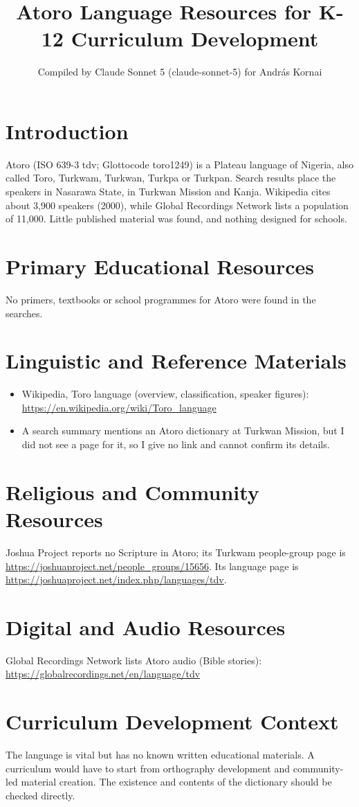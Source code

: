 \documentclass[12pt]{article}
\title{Atoro Language Resources for K-12 Curriculum Development}
\author{Compiled by Claude Sonnet 5 (claude-sonnet-5) for Andr\'as Kornai}
\date{}
\begin{document}
\maketitle

\section{Introduction}
Atoro (ISO 639-3 tdv; Glottocode toro1249) is a Plateau language of Nigeria, also called Toro, Turkwam, Turkwan, Turkpa or Turkpan. Search results place the speakers in Nasarawa State, in Turkwan Mission and Kanja. Wikipedia cites about 3,900 speakers (2000), while Global Recordings Network lists a population of 11,000. Little published material was found, and nothing designed for schools.

\section{Primary Educational Resources}
No primers, textbooks or school programmes for Atoro were found in the searches.

\section{Linguistic and Reference Materials}
\begin{itemize}
\item Wikipedia, Toro language (overview, classification, speaker figures): \url{https://en.wikipedia.org/wiki/Toro_language}
\item A search summary mentions an Atoro dictionary at Turkwan Mission, but I did not see a page for it, so I give no link and cannot confirm its details.
\end{itemize}

\section{Religious and Community Resources}
Joshua Project reports no Scripture in Atoro; its Turkwam people-group page is \url{https://joshuaproject.net/people_groups/15656}. Its language page is \url{https://joshuaproject.net/index.php/languages/tdv}.

\section{Digital and Audio Resources}
Global Recordings Network lists Atoro audio (Bible stories): \url{https://globalrecordings.net/en/language/tdv}

\section{Curriculum Development Context}
The language is vital but has no known written educational materials. A curriculum would have to start from orthography development and community-led material creation. The existence and contents of the dictionary should be checked directly.
\end{document}

